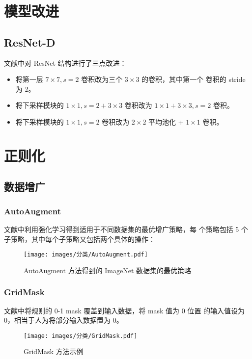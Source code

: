 \section{模型改进}
\subsection{ResNet-D}
文献中对 ResNet 结构进行了三点改进：
\begin{itemize}
  \item 将第一层 $7 \times 7, s=2$ 卷积改为三个 $3 \times 3$ 的卷积，其中第一个
    卷积的 stride 为 2。
  \item 将下采样模块的 $1 \times 1, s=2 + 3 \times 3$ 卷积改为 $1 \times 1 + 3
    \times 3, s=2$ 卷积。
  \item 将下采样模块的 $1 \times 1, s=2$ 卷积改为 $2 \times 2$ 平均池化 + $1
    \times 1$ 卷积。
\end{itemize}

\section{正则化}
\subsection{数据增广}
\subsubsection{AutoAugment}
文献中利用强化学习得到适用于不同数据集的最优增广策略，每
个策略包括 5 个子策略，其中每个子策略又包括两个具体的操作：

\begin{figure}[ht]
  \centering
  \texttt{[image: images/分类/AutoAugment.pdf]}
  \caption{AutoAugment 方法得到的 ImageNet 数据集的最优策略}
  \label{fig:autoaugment}
\end{figure}


\subsubsection{GridMask}
文献中将规则的 0-1 mask 覆盖到输入数据，将 mask 值为 0 位置
的输入值设为 0，相当于人为将部分输入数据置为 0。

\begin{figure}[ht]
  \centering
  \texttt{[image: images/分类/GridMask.pdf]}
  \caption{GridMask 方法示例}
  \label{fig:gridmask}
\end{figure}

